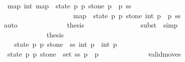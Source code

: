 \begin{isabellebody}
\ {\isacharasterisk}{\isacharcolon}\ {\isachardoublequoteopen}{\isacharparenleft}map\ int\ {\isacharparenleft}map\ {\isacharparenleft}{\isasymlambda}\ {\isacharparenleft}state{\isacharcomma}\ p{}{\isacharcomma}\ p{}{\isacharcomma}\ stone{\isacharparenright}{\isachardot}\ p{}\ {\isacharminus}\ p{}{\isacharparenright}\ ss{\isacharparenright}{\isacharparenright}\ {\isacharequal}\ \isanewline
\ \ \ \ \ \ \ \ \ \ \ \ \ \ \ \ \ \ \ \ \ {\isacharparenleft}map\ {\isacharparenleft}{\isasymlambda}\ {\isacharparenleft}state{\isacharcomma}\ p{}{\isacharcomma}\ p{}{\isacharcomma}\ stone{\isacharparenright}{\isachardot}\ int\ {\isacharparenleft}p{}\ {\isacharminus}\ p{}{\isacharparenright}{\isacharparenright}\ ss{\isacharparenright}{\isachardoublequoteclose}\isanewline
\ \ \ \ \ \ \ \ \ \ \ \ \ \ \isamarkupfalse%
\ auto\isanewline
\ \ \ \ \ \ \ \ \ \ \ \ \isamarkupfalse%
\ {\isacharquery}thesis\isanewline
\ \ \ \ \ \ \ \ \ \ \ \ \ \ \isamarkupfalse%
\ {\isacharparenleft}subst\ {\isacharasterisk}{\isacharcomma}\ simp{\isacharparenright}\isanewline
\ \ \ \ \ \ \ \ \ \ \isamarkupfalse%
\isanewline
\ \ \ \ \ \ \ \ \ \ \isamarkupfalse%
\ \isamarkupfalse%
\ {\isacharquery}thesis\isanewline
\ \ \ \ \ \ \ \ \ \ \ \ \isacommand{{\isachardot}}\isamarkupfalse%
\isanewline
\ \ \ \ \ \ \ \ \isamarkupfalse%
\isanewline
\ \ \ \ \ \ \ \ \isamarkupfalse%
\ \isamarkupfalse%
\ {\isachardoublequoteopen}{\isachardot}{\isachardot}{\isachardot}\ {\isacharequal}\ {\isacharparenleft}{\isasymSum}\ {\isacharparenleft}state{\isacharcomma}\ p{}{\isacharcomma}\ p{}{\isacharcomma}\ stone{\isacharparenright}\ {\isasymleftarrow}\ ss{\isachardot}\ int\ p{}\ {\isacharminus}\ int\ p{}{\isacharparenright}{\isachardoublequoteclose}\isanewline
\ \ \ \ \ \ \ \ \isamarkupfalse%
{\isacharminus}\isanewline
\ \ \ \ \ \ \ \ \ \ \isamarkupfalse%
\ {\isachardoublequoteopen}{\isasymforall}\ {\isacharparenleft}state{\isacharcomma}\ p{}{\isacharcomma}\ p{}{\isacharcomma}\ stone{\isacharparenright}\ {\isasymin}\ set\ ss{\isachardot}\ p{}\ {\isasymge}\ p{}{\isachardoublequoteclose}\isanewline
\ \ \ \ \ \ \ \ \ \ \ \ \isamarkupfalse%
\ valid{\isacharunderscore}moves{\isacharprime}\isanewline
\ \ \ \ \ \ \ \ \ \ \ \ \isamarkupfalse%

\end{isabellebody}
